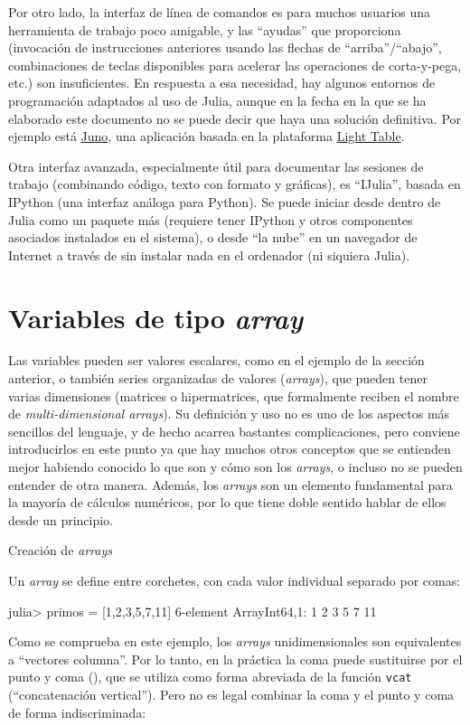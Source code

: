﻿\documentclass{article}
\newcommand{\jl}{\texttt}
\begin{document}
Por otro lado, la interfaz de línea de comandos es para muchos usuarios una herramienta de trabajo poco amigable, y las ``ayudas'' que proporciona (invocación de instrucciones anteriores usando las flechas de ``arriba''/``abajo'', combinaciones de teclas disponibles para acelerar las operaciones de corta-y-pega, etc.) son insuficientes. En respuesta a esa necesidad, hay algunos entornos de programación adaptados al uso de Julia, aunque en la fecha en la que se ha elaborado este documento no se puede decir que haya una solución definitiva. Por ejemplo está \href{http://junolab.org/}{Juno}, una aplicación basada en la plataforma \href{http://lighttable.com/}{Light Table}.

Otra interfaz avanzada, especialmente útil para documentar las sesiones de trabajo (combinando código, texto con formato y gráficas), es ``IJulia'', basada en IPython (una interfaz análoga para Python). Se puede iniciar desde dentro de Julia como un paquete más (requiere tener IPython y otros componentes asociados instalados en el sistema), o desde ``la nube'' en un navegador de Internet a través de  sin instalar nada en el ordenador (ni siquiera Julia).


\section{Variables de tipo \emph{array}}

Las variables pueden ser valores escalares, como en el ejemplo de la sección anterior, o también series organizadas de valores (\emph{arrays}), que pueden tener varias dimensiones (matrices o hipermatrices, que formalmente reciben el nombre de \emph{multi-dimensional arrays}). Su definición y uso no es uno de los aspectos más sencillos del lenguaje, y de hecho acarrea bastantes complicaciones, pero conviene introducirlos en este punto ya que hay muchos otros conceptos que se entienden mejor habiendo conocido lo que son y cómo son los \emph{arrays}, o incluso no se pueden entender de otra manera. Además, los \emph{arrays} son un elemento fundamental para la mayoría de cálculos numéricos, por lo que tiene doble sentido hablar de ellos desde un principio.

Creación de \emph{arrays}

Un \emph{array} se define entre corchetes, con cada valor individual separado por comas:

julia> primos = [1,2,3,5,7,11]
6-element Array{Int64,1}:
 1
 2
 3
 5
 7
 11

Como se comprueba en este ejemplo, los \emph{arrays} unidimensionales son equivalentes a ``vectores columna''. Por lo tanto, en la práctica la coma puede sustituirse por el punto y coma (\jlt{;}), que se utiliza como forma abreviada de la función \jl{vcat} (``concatenación vertical''). Pero no es legal combinar la coma y el punto y coma de forma indiscriminada:
\end{document}
